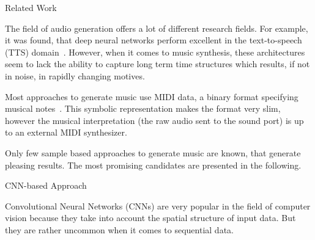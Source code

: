 \documentclass[final,hyperref={pdfpagelabels=false}]{beamer}
\newcommand{\blocktextwidth}{0.93\textwidth}
\begin{document}
\begin{frame}[t]
\begin{columns}[t]
\begin{column}{.31\textwidth}
            
\begin{block}{Related Work}
\begin{minipage}[]{\blocktextwidth}
The field of audio generation offers a lot of different research fields.
For example, it was found, that deep neural networks perform excellent in the text-to-speech (TTS) domain~\cite{van2016wavenet, arik2017deep, chung2015recurrent, kalchbrenner2018efficient}.
However, when it comes to music synthesis, these architectures seem to lack the ability to capture long term time structures which results, if not in noise, in rapidly changing motives.

Most approaches to generate music use MIDI data, a binary format specifying musical notes~\cite{yang2017midinet, mogren2016c, tikhonov2017music, hennig2017classifying}.
This symbolic representation makes the format very slim, however the musical interpretation (the raw audio sent to the sound port) is up to an external MIDI synthesizer.

Only few sample based approaches to generate music are known, that generate pleasing results.
The most promising candidates are presented in the following.

\end{minipage}
\end{block}


\begin{block}{CNN-based Approach}
\begin{minipage}[]{\blocktextwidth}
Convolutional Neural Networks (CNNs) are very popular in the field of computer vision because they take into account the spatial structure of input data.
But they are rather uncommon when it comes to sequential data.


\end{minipage}
\end{block}
\end{column}
\end{columns}
\end{frame}
\end{document}
